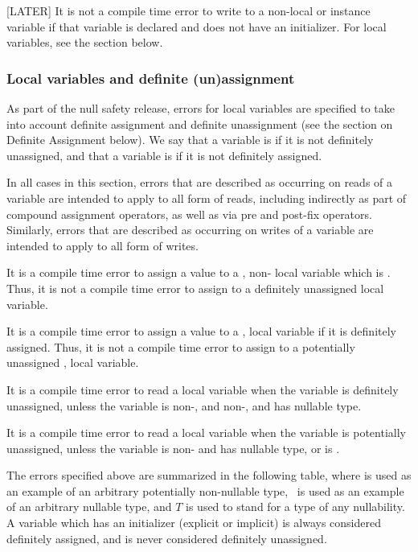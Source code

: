 \documentclass[makeidx]{article}
\begin{document}
{[LATER] It is not a compile time error to write to a \FINAL{}
non-local or instance variable if that variable is declared \LATE{}
and does not have an initializer.  For local variables, see the
section below.

\subsubsection{Local variables and definite (un)assignment}

As part of the null safety release, errors for local variables are specified to
take into account definite assignment and definite unassignment (see the
section on Definite Assignment below).  We say that a variable is
if it is not definitely unassigned, and that a variable is
 if it is not definitely assigned.

In all cases in this section, errors that are described as occurring on reads of
a variable are intended to apply to all form of reads, including indirectly as
part of compound assignment operators, as well as via pre and post-fix
operators.  Similarly, errors that are described as occurring on writes of a
variable are intended to apply to all form of writes.

It is a compile time error to assign a value to a \FINAL, non-\LATE{} local
variable which is .  Thus, it is not a compile time
error to assign to a definitely unassigned \FINAL{} local variable.

It is a compile time error to assign a value to a \FINAL, \LATE{} local variable
if it is definitely assigned. Thus, it is not a compile time error to
assign to a potentially unassigned \FINAL, \LATE{} local variable.


It is a compile time error to read a local variable when the variable is
definitely unassigned, unless the variable is non-\FINAL, and non-\LATE,
and has nullable type.

It is a compile time error to read a local variable when the variable is
potentially unassigned, unless the variable is non-\FINAL{} and has nullable
type, or is \LATE.

The errors specified above are summarized in the following table, where  is
used as an example of an arbitrary potentially non-nullable type, \ is
used as an example of an arbitrary nullable type, and $T$ is used to stand
for a type of any nullability.  A variable which has an initializer (explicit or
implicit) is always considered definitely assigned, and is never considered
definitely unassigned.

}
\end{document}
